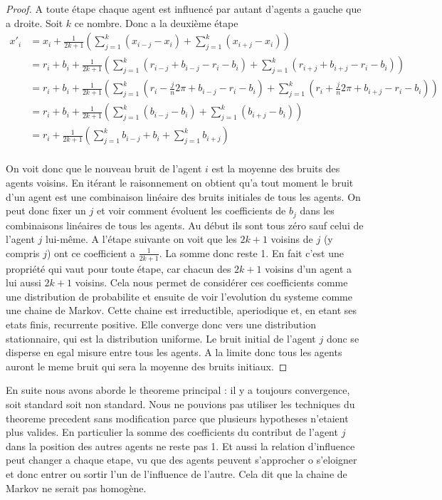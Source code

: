 \documentclass[a4paper,10pt]{report}
\begin{document}
\begin{proof}
A toute étape chaque agent est influencé par autant d'agents a gauche que a droite. Soit $k$ ce nombre. Donc a la deuxième étape
\begin{equation*}
\begin{split}
x'_i &= x_i + \frac{1}{2k+1} \left( \sum_{j=1}^k (x_{i-j} - x_i) + \sum_{j=1}^k (x_{i+j} - x_i) \right) \\
     &= r_i + b_i + \frac{1}{2k+1} \left( \sum_{j=1}^k (r_{i-j} + b_{i-j} - r_i - b_i) + \sum_{j=1}^k (r_{i+j} + b_{i+j} - r_i - b_i) \right) \\
     &= r_i + b_i + \frac{1}{2k+1} \left( \sum_{j=1}^k (r_i - \frac{j}{n}2 \pi + b_{i-j} - r_i - b_i) + \sum_{j=1}^k (r_i + \frac{j}{n}2 \pi + b_{i+j} - r_i - b_i) \right) \\
     &= r_i + b_i + \frac{1}{2k+1} \left( \sum_{j=1}^k (b_{i-j} - b_i) + \sum_{j=1}^k (b_{i+j} - b_i) \right) \\
     &= r_i + \frac{1}{2k+1} \left( \sum_{j=1}^k b_{i-j} + b_i + \sum_{j=1}^k b_{i+j} \right) \\
\end{split}
\end{equation*}

On voit donc que le nouveau bruit de l'agent $i$ est la moyenne des bruits des agents voisins. En itérant le raisonnement on obtient qu'a tout moment le bruit d'un agent est une combinaison linéaire des bruits initiales de tous les agents. On peut donc fixer un $j$ et voir comment évoluent les coefficients de $b_j$ dans les combinaisons linéaires de tous les agents. Au début ils sont tous zéro sauf celui de l'agent $j$ lui-même. A l’étape suivante on voit que les $2k+1$ voisins de $j$ (y compris $j$) ont ce coefficient a $\frac{1}{2k+1}$. La somme donc reste 1. En fait c'est une propriété qui vaut pour toute étape, car chacun des $2k+1$ voisins d'un agent a lui aussi $2k+1$ voisins. Cela nous permet de considérer ces coefficients comme une distribution de probabilite et ensuite de voir l'evolution du systeme comme une chaine de Markov. Cette chaine est irreductible, aperiodique et, en etant ses etats finis, recurrente positive. Elle converge donc vers une distribution stationnaire, qui est la distribution uniforme. Le bruit initial de l'agent $j$ donc se disperse en egal misure entre tous les agents. A la limite donc tous les agents auront le meme bruit qui sera la moyenne des bruits initiaux.
\end{proof}

En suite nous avons aborde le theoreme principal : il y a toujours convergence, soit standard soit non standard. Nous ne pouvions pas utiliser les techniques du theoreme precedent sans modification parce que plusieurs hypotheses n'etaient plus valides. En particulier la somme des coefficients du contribut de l'agent $j$ dans la position des autres agents ne reste pas 1. Et aussi la relation d'influence peut changer a chaque etape, vu que des agents peuvent s'approcher o s'eloigner et donc entrer ou sortir l'un de l'influence de l'autre. Cela dit que la chaine de Markov ne serait pas homogène.
\end{document}
